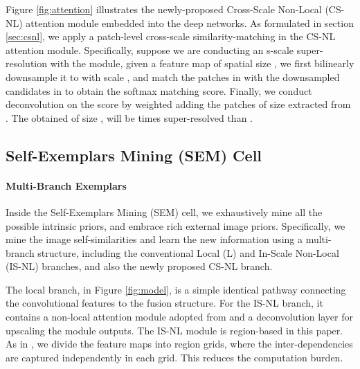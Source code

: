 \documentclass[10pt,twocolumn,letterpaper]{article}
\begin{document}
Figure \ref{fig:attention} illustrates the newly-proposed Cross-Scale Non-Local (CS-NL) attention module embedded into the deep networks. As formulated in section \ref{sec:csnl}, we apply a patch-level cross-scale similarity-matching in the CS-NL attention module. Specifically, suppose we are conducting an s-scale super-resolution with the module, given a feature map  of spatial size , we first bilinearly downsample it to  with scale , and match the  patches in  with the downsampled  candidates in  to obtain the softmax matching score. Finally, we conduct deconvolution on the score by weighted adding the patches of size  extracted from . The obtained  of size , will be  times super-resolved than . \subsection{Self-Exemplars Mining (SEM) Cell}

\paragraph{Multi-Branch Exemplars}
Inside the Self-Exemplars Mining (SEM) cell, we exhaustively mine all the possible intrinsic priors, and embrace rich external image priors. Specifically, we mine the image self-similarities and learn the new information using a multi-branch structure, including the conventional Local (L) and In-Scale Non-Local (IS-NL) branches, and also the newly proposed CS-NL branch.  

The local branch, in Figure \ref{fig:model}, is a simple identical pathway connecting the convolutional features to the fusion structure. For the IS-NL branch, it contains a non-local attention module adopted from \cite{dai2019second} and a deconvolution layer for upscaling the module outputs. The IS-NL module is region-based in this paper. As in \cite{dai2019second}, we divide the feature maps into region grids, where the inter-dependencies are captured independently in each grid. This reduces the computation burden. 
\end{document}
